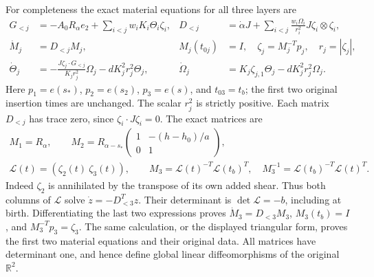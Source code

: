 For completeness the exact material equations for all three layers are
\begin{align}\label{cvlane:tts:material}
 G_{<j}&=-A_0R_\alpha e_2+\sum_{i<j}w_iK_i\Theta_i\zeta_i,
 &D_{<j}&=\dot\alpha J+
   \sum_{i<j}\frac{w_i\Omega_i}{r_i^2}J\zeta_i\otimes\zeta_i,
 \nonumber\\
 \dot M_j&=D_{<j}M_j,& M_j(t_{0j})&=I,
 \quad\zeta_j=M_j^{-T}p_j,\quad r_j=|\zeta_j|,\\
 \dot\Theta_j&=-\frac{J\zeta_j\cdot G_{<j}}{K_jr_j^2}\Omega_j
                       -dK_j^2r_j^2\Theta_j,
 &\dot\Omega_j&=K_j\zeta_{j,1}\Theta_j-dK_j^2r_j^2\Omega_j.
 \nonumber
\end{align}
Here $p_1=e(s_*)$, $p_2=e(s_2)$, $p_3=e(s)$, and
$t_{03}=t_b$; the first two original insertion times are unchanged.
The scalar $r_j^2$ is strictly positive. Each matrix $D_{<j}$ has
trace zero, since $\zeta_i\cdot J\zeta_i=0$.
The exact matrices are
\begin{equation}\label{cvlane:tts:matrices}
 \begin{gathered}
 M_1=R_\alpha,\qquad
 M_2=R_{\alpha-s_*}
       \begin{pmatrix}1&-(h-h_0)/a\\0&1\end{pmatrix},\\
 \mathcal L(t)=(\zeta_2(t)\ \zeta_3(t)),\qquad
 M_3=\mathcal L(t)^{-T}\mathcal L(t_b)^T,\quad
 M_3^{-1}=\mathcal L(t_b)^{-T}\mathcal L(t)^T.
 \end{gathered}
\end{equation}
Indeed $\zeta_2$ is annihilated by the transpose of its own
added shear. Thus both columns of $\mathcal L$ solve
$\dot z=-D_{<3}^Tz$. Their determinant is
$\det\mathcal L=-b$, including at birth. Differentiating the
last two expressions proves $\dot M_3=D_{<3}M_3$,
$M_3(t_b)=I$, and $M_3^{-T}p_3=\zeta_3$.
The same calculation, or the displayed triangular form, proves
the first two material equations and their original data.
All matrices have determinant one, and hence define global linear
diffeomorphisms of the original $\mathbb R^2$.


